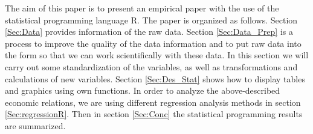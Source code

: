 The aim of this paper is to present an empirical paper with the use of the statistical programming language R. The paper is organized as follows. Section \ref{Sec:Data} provides information of the raw data. Section \ref{Sec:Data_Prep} is a process to improve the quality of the data information and to put raw data into the form so that we can work scientifically with these data. In this section we will carry out some standardization of the variables, as well as transformations and calculations of new variables. Section \ref{Sec:Des_Stat} shows how to display tables and graphics using own functions. In order to analyze the above-described economic relations, we are using different regression analysis methods in section \ref{Sec:regressionR}. Then in section \ref{Sec:Conc} the statistical programming results are summarized.
